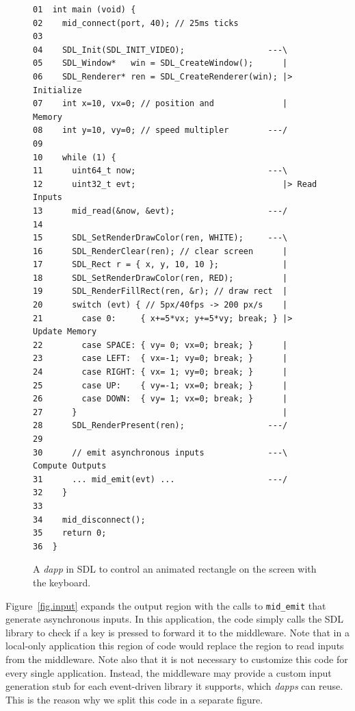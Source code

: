 \documentclass[sigplan,screen]{acmart}
\newcommand{\dapp}{\emph{dapp}\xspace}
\newcommand{\dapps}{\emph{dapps}\xspace}
\begin{document}
\begin{figure}[t]
{\scriptsize
\begin{verbatim}
01  int main (void) {
02    mid_connect(port, 40); // 25ms ticks
03
04    SDL_Init(SDL_INIT_VIDEO);                 ---\
05    SDL_Window*   win = SDL_CreateWindow();      |
06    SDL_Renderer* ren = SDL_CreateRenderer(win); |> Initialize
07    int x=10, vx=0; // position and              |    Memory
08    int y=10, vy=0; // speed multipler        ---/
09
10    while (1) {
11      uint64_t now;                           ---\
12      uint32_t evt;                              |> Read Inputs
13      mid_read(&now, &evt);                   ---/
14
15      SDL_SetRenderDrawColor(ren, WHITE);     ---\
16      SDL_RenderClear(ren); // clear screen      |
17      SDL_Rect r = { x, y, 10, 10 };             |
18      SDL_SetRenderDrawColor(ren, RED);          |
19      SDL_RenderFillRect(ren, &r); // draw rect  |
20      switch (evt) { // 5px/40fps -> 200 px/s    |
21        case 0:     { x+=5*vx; y+=5*vy; break; } |> Update Memory
22        case SPACE: { vy= 0; vx=0; break; }      |
23        case LEFT:  { vx=-1; vy=0; break; }      |
24        case RIGHT: { vx= 1; vy=0; break; }      |
25        case UP:    { vy=-1; vx=0; break; }      |
26        case DOWN:  { vy= 1; vx=0; break; }      |
27      }                                          |
28      SDL_RenderPresent(ren);                 ---/
29
30      // emit asynchronous inputs             ---\  Compute Outputs
31      ... mid_emit(evt) ...                   ---/
32    }
33
34    mid_disconnect();
35    return 0;
36  }
\end{verbatim}
}
  \caption{
    \label{fig.sdl}
    A \dapp in SDL to control an animated rectangle on the screen with the keyboard.
  }
\end{figure}

Figure~\ref{fig.input} expands the output region with the calls to
\texttt{mid\_emit} that generate asynchronous inputs.
In this application, the code simply calls the SDL library to check if a key is
pressed to forward it to the middleware.
Note that in a local-only application this region of code would replace the
region to read inputs from the middleware.
Note also that it is not necessary to customize this code for every single
application.
Instead, the middleware may provide a custom input generation stub for each
event-driven library it supports, which \dapps can reuse.
This is the reason why we split this code in a separate figure.
\end{document}
